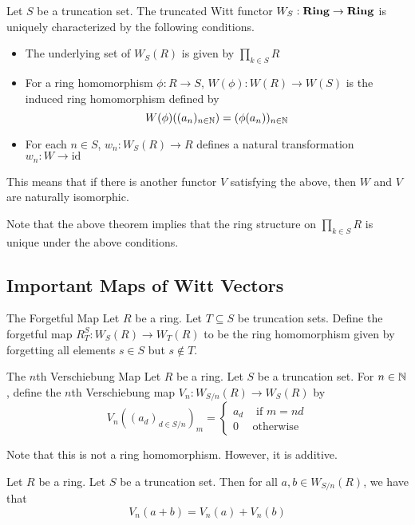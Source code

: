 \documentclass[a4paper]{article}
\begin{document}
\begin{prp}{}{} Let $S$ be a truncation set. The truncated Witt functor $W_S:\bold{Ring}\to\bold{Ring}$ is uniquely characterized by the following conditions. 
\begin{itemize}
\item The underlying set of $W_S(R)$ is given by $\prod_{k\in S}R$
\item For a ring homomorphism $\phi:R\to S$, $W(\phi):W(R)\to W(S)$ is the induced ring homomorphism defined by $$W(\phi)((a_n)_{n\in\mathbb{N}})=(\phi(a_n))_{n\in\mathbb{N}}$$
\item For each $n\in S$, $w_n:W_S(R)\to R$ defines a natural transformation $w_n:W\rightarrow\text{id}$
\end{itemize}
This means that if there is another functor $V$ satisfying the above, then $W$ and $V$ are naturally isomorphic. 
\end{prp}

Note that the above theorem implies that the ring structure on $\prod_{k\in S}R$ is unique under the above conditions. 

\subsection{Important Maps of Witt Vectors}
\begin{defn}{The Forgetful Map}{} Let $R$ be a ring. Let $T\subseteq S$ be truncation sets. Define the forgetful map $R_T^S:W_S(R)\to W_T(R)$ to be the ring homomorphism given by forgetting all elements $s\in S$ but $s\notin T$. 
\end{defn}

\begin{defn}{The $n$th Verschiebung Map}{} Let $R$ be a ring. Let $S$ be a truncation set. For $n\in\mathbb{N}$, define the $n$th Verschiebung map $V_n:W_{S/n}(R)\to W_S(R)$ by $$V_n((a_d)_{d\in S/n})_m=\begin{cases}
a_d & \text{ if } m=nd\\
0 & \text{otherwise}
\end{cases}$$
\end{defn}

Note that this is not a ring homomorphism. However, it is additive. 

\begin{lmm}{}{} Let $R$ be a ring. Let $S$ be a truncation set. Then for all $a,b\in W_{S/n}(R)$, we have that $$V_n(a+b)=V_n(a)+V_n(b)$$
\end{lmm}
\end{document}
